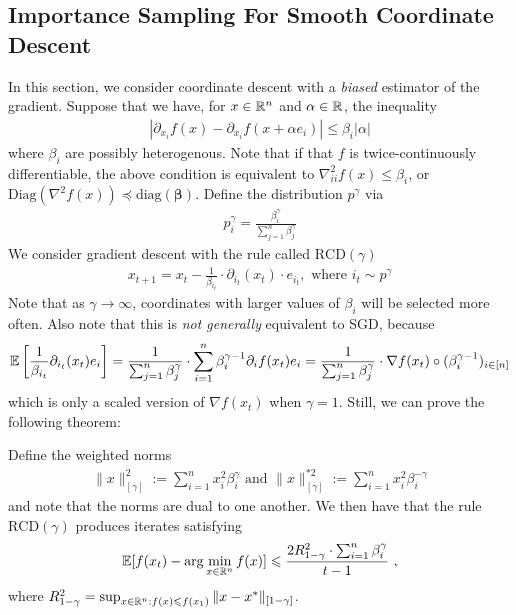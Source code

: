	\subsection{Importance Sampling For Smooth Coordinate Descent}
	In this section, we consider coordinate descent with a \emph{biased}
  estimator of the gradient. Suppose that we have, for $x \in \mathbb{R}^n$
  and $\alpha \in \mathbb{R}$, the inequality
	\begin{eqnarray}
    |\partial_{x_i} f(x) - \partial_{x_i} f(x + \alpha e_i)|
    \le \beta_{i}|\alpha|
	\end{eqnarray}
	where $\beta_i$ are possibly heterogenous. Note that if that $f$ is twice-continuously differentiable, the above condition is equivalent to $\nabla^2_{ii}f(x) \le \beta_i$, or $\mathrm{Diag}(\nabla^2 f(x)) \preceq \mathrm{diag}(\boldsymbol{\beta})$.  Define the distribution $p^\gamma$ via
	\begin{eqnarray}
	p^{\gamma}_i = \frac{\beta_i^{\gamma}}{\sum_{j=1}^n \beta_j^{\gamma}}
	\end{eqnarray}
	We consider gradient descent with the rule called $\mathrm{RCD}(\gamma)$
	\begin{eqnarray}\label{RCDgamma}
    x_{t+1} = x_t - \frac{1}{\beta_{i_t}} \cdot \partial_{i_t}(x_t) \cdot e_{i_t}, \text{ where } i_t \sim p^{\gamma}
	\end{eqnarray}
  Note that as $\gamma \to \infty$, coordinates with larger values of $\beta_i$
  will be selected more often.
	Also note that this is \emph{not generally} equivalent to SGD, because 
	\begin{eqnarray}
    \operatorname*{\mathbb{E}}\left[\frac{1}{\beta_{i_t}}\partial_{i_t}(x_t)e_i\right]
    = \frac{1}{\sum_{j=1}^n \beta_j^{\gamma}} \cdot \sum_{i=1}^n \beta_{i}^{\gamma - 1} \partial_i f(x_t)e_i
    = \frac{1}{\sum_{j=1}^n \beta_j^{\gamma}} \cdot \nabla f(x_t) \circ (\beta_i^{\gamma - 1})_{i \in [n]}
	\end{eqnarray}
	which is only a scaled version of $\nabla f(x_t)$ when $\gamma = 1$. Still, we can prove the following theorem:
	\begin{theorem}
  \label{thm:6.7}
  Define the weighted norms
	\begin{eqnarray}
	\|x\|_{[\gamma]}^2 := \sum_{i=1}^n x_i^2 \beta_i^\gamma \text{ and } \|x\|_{[\gamma]}^{*2} := \sum_{i=1}^n x_i^2 \beta_i^{-\gamma}
	\end{eqnarray}
	and note that the norms are dual to one another.
  We then have that the rule $\mathrm{RCD}(\gamma)$ produces iterates satisfying
	\begin{eqnarray}
	  \operatorname*{\mathbb{E}}[f(x_t) - \arg\min_{x \in \mathbb{R}^{n}} f(x)]
    \leqslant \frac{2 R^2_{1-\gamma} \cdot \sum_{i=1}^n \beta_{i}^{\gamma}}{t-1}~,
	\end{eqnarray}
	where $R^2_{1-\gamma} = \sup_{x \in \mathbb{R}^n:f(x) \leqslant f(x_1)} \|x - x^*\|_{[1 - \gamma]}$.
	\end{theorem}
